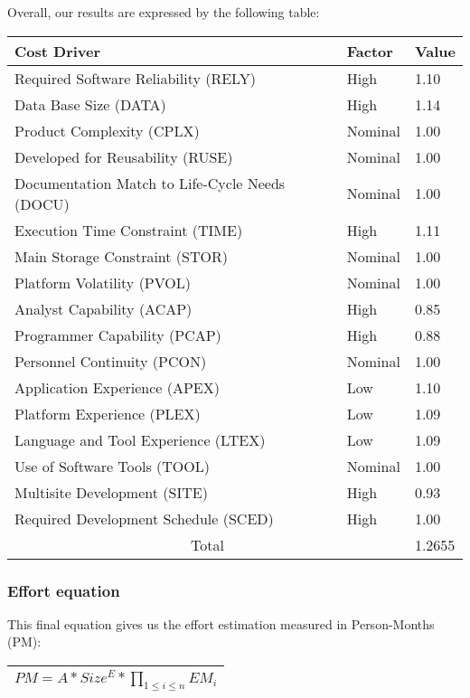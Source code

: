 Overall, our results are expressed by the following table:
\begin{table}[H]
	\centering
	\begin{tabular}{| m{9.5cm} | m{1.8cm} | m{1.2cm} |}
		\hline
		\textbf{Cost Driver} & \textbf{Factor}& \textbf{Value} \\
		\hline
		Required Software Reliability (RELY) & High & 1.10 \\
		Data Base Size (DATA) & High & 1.14 \\
		Product Complexity (CPLX) & Nominal & 1.00 \\
		Developed for Reusability (RUSE) & Nominal & 1.00 \\
		Documentation Match to Life-Cycle Needs (DOCU) & Nominal & 1.00 \\
		Execution Time Constraint (TIME) & High & 1.11 \\
		Main Storage Constraint (STOR) & Nominal & 1.00 \\
		Platform Volatility (PVOL) & Nominal & 1.00 \\
		Analyst Capability (ACAP) & High & 0.85 \\
		Programmer Capability (PCAP) & High & 0.88 \\
		Personnel Continuity (PCON) & Nominal & 1.00 \\
		Application Experience (APEX) & Low & 1.10 \\
		Platform Experience (PLEX) & Low & 1.09 \\
		Language and Tool Experience (LTEX) & Low & 1.09 \\
		Use of Software Tools (TOOL) & Nominal & 1.00 \\
		Multisite Development (SITE) & High & 0.93 \\
		Required Development Schedule (SCED) & High & 1.00 \\
		\hline
		\multicolumn{2}{|c|}{Total} & 1.2655 \\
		\hline
	\end{tabular}
\end{table}

\subsubsection{Effort equation}
This final equation gives us the effort estimation measured in Person-Months (PM):

\begin{table}[H]
	\centering
	\begin{tabular}{| m{13cm} |}
		\hline
		\(PM = A * Size^E * \prod_{1 \leq i \leq n} EM_i \)\\ [0.6ex]
		\hline
	\end{tabular}
\end{table}

